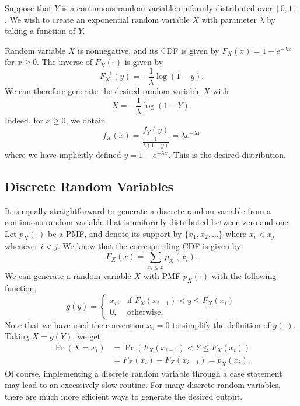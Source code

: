 \begin{example}
Suppose that $Y$ is a continuous random variable uniformly distributed over $[0,1]$.
We wish to create an exponential random variable $X$ with parameter $\lambda$ by taking a function of $Y$.

Random variable $X$ is nonnegative, and its CDF is given by $F_X(x) = 1 - e^{- \lambda x}$ for $x \geq 0$.
The inverse of $F_X (\cdot)$ is given by
\begin{equation*}
F_X^{-1} (y) = - \frac{1}{\lambda} \log (1 - y) .
\end{equation*}
We can therefore generate the desired random variable $X$ with
\begin{equation*}
X = - \frac{1}{\lambda} \log (1 - Y) .
\end{equation*}
Indeed, for $x \geq 0$, we obtain
\begin{equation*}
f_X (x) = \frac{ f_Y (y) }{ \frac{1}{\lambda (1 - y)} }
= \lambda e^{- \lambda x}
\end{equation*}
where we have implicitly defined $y = 1 - e^{- \lambda x}$.
This is the desired distribution.
\end{example}


\subsection{Discrete Random Variables}

It is equally straightforward to generate a discrete random variable from a continuous random variable that is uniformly distributed between zero and one.
Let $p_X(\cdot)$ be a PMF, and denote its support by $\{ x_1, x_2, \ldots \}$ where $x_i < x_j$ whenever $i < j$.
We know that the corresponding CDF is given by
\begin{equation*}
F_X(x) = \sum_{x_i \leq x} p_X (x_i) .
\end{equation*}
We can generate a random variable $X$ with PMF $p_X(\cdot)$ with the following function,
\begin{equation*}
g(y) = \begin{cases} x_i, & \text{if } F_X(x_{i-1}) < y \leq F_X (x_i) \\
0, & \text{otherwise}. \end{cases}
\end{equation*}
Note that we have used the convention $x_0 = 0$ to simplify the definition of $g(\cdot)$.
Taking $X = g(Y)$, we get
\begin{equation*}
\begin{split}
\Pr (X = x_i) &= \Pr ( F_X(x_{i-1}) < Y \leq F_X (x_i) ) \\
&= F_X (x_i) - F_X (x_{i-1}) = p_X (x_i) .
\end{split}
\end{equation*}
Of course, implementing a discrete random variable through a case statement may lead to an excessively slow routine.
For many discrete random variables, there are much more efficient ways to generate the desired output.


